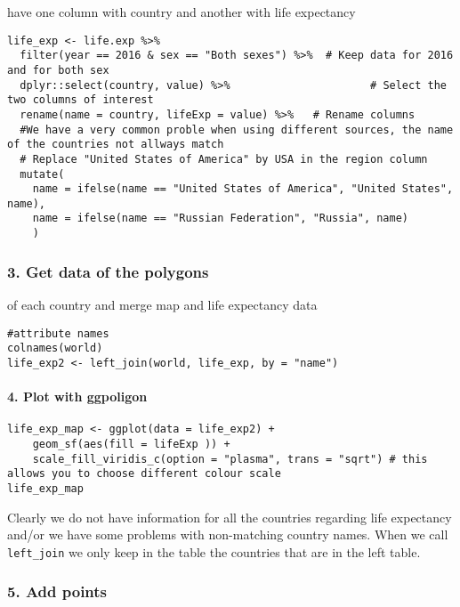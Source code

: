\documentclass[
]{book}
\theoremstyle{definition}
\theoremstyle{definition}
\theoremstyle{definition}
\theoremstyle{definition}
\theoremstyle{remark}
\begin{document}
have one column with country and another with life expectancy

\begin{verbatim}
life_exp <- life.exp %>%
  filter(year == 2016 & sex == "Both sexes") %>%  # Keep data for 2016 and for both sex
  dplyr::select(country, value) %>%                      # Select the two columns of interest
  rename(name = country, lifeExp = value) %>%   # Rename columns
  #We have a very common proble when using different sources, the name of the countries not allways match
  # Replace "United States of America" by USA in the region column
  mutate(
    name = ifelse(name == "United States of America", "United States", name), 
    name = ifelse(name == "Russian Federation", "Russia", name)
    )
\end{verbatim}

\hypertarget{get-data-of-the-polygons}{%
\subsubsection{3. Get data of the polygons}\label{get-data-of-the-polygons}}

of each country and merge map and life expectancy data

\begin{verbatim}
#attribute names
colnames(world)
life_exp2 <- left_join(world, life_exp, by = "name")
\end{verbatim}

\hypertarget{plot-with-ggpoligon}{%
\paragraph{4. Plot with ggpoligon}\label{plot-with-ggpoligon}}

\begin{verbatim}
life_exp_map <- ggplot(data = life_exp2) +
    geom_sf(aes(fill = lifeExp )) +
    scale_fill_viridis_c(option = "plasma", trans = "sqrt") # this allows you to choose different colour scale
life_exp_map
\end{verbatim}

Clearly we do not have information for all the countries regarding life expectancy and/or we have some problems with non-matching country names. When we call \texttt{left\_join} we only keep in the table the countries that are in the left table.

\hypertarget{add-points}{%
\subsubsection{5. Add points}\label{add-points}}
\end{document}
